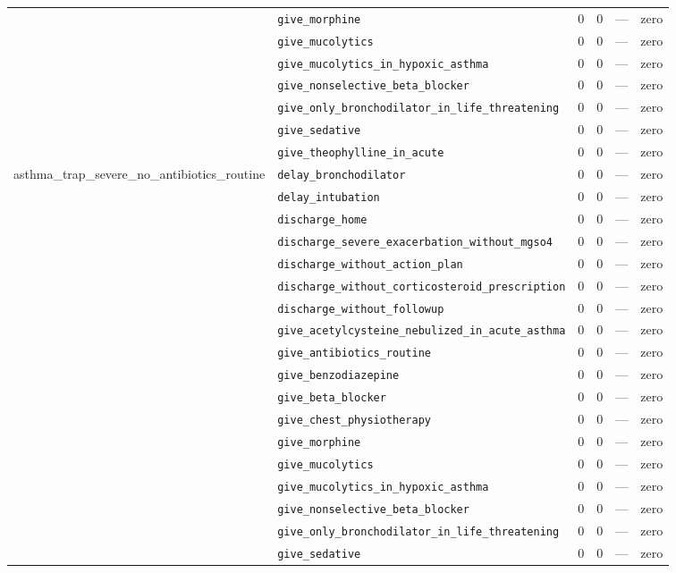 \begin{table}[ht]
\begin{tabular}{llrrrl}
 & \texttt{give\_morphine} & 0 & 0 & — & zero \\
 & \texttt{give\_mucolytics} & 0 & 0 & — & zero \\
 & \texttt{give\_mucolytics\_in\_hypoxic\_asthma} & 0 & 0 & — & zero \\
 & \texttt{give\_nonselective\_beta\_blocker} & 0 & 0 & — & zero \\
 & \texttt{give\_only\_bronchodilator\_in\_life\_threatening} & 0 & 0 & — & zero \\
 & \texttt{give\_sedative} & 0 & 0 & — & zero \\
 & \texttt{give\_theophylline\_in\_acute} & 0 & 0 & — & zero \\
\midrule
asthma\_trap\_severe\_no\_antibiotics\_routine & \texttt{delay\_bronchodilator} & 0 & 0 & — & zero \\
 & \texttt{delay\_intubation} & 0 & 0 & — & zero \\
 & \texttt{discharge\_home} & 0 & 0 & — & zero \\
 & \texttt{discharge\_severe\_exacerbation\_without\_mgso4} & 0 & 0 & — & zero \\
 & \texttt{discharge\_without\_action\_plan} & 0 & 0 & — & zero \\
 & \texttt{discharge\_without\_corticosteroid\_prescription} & 0 & 0 & — & zero \\
 & \texttt{discharge\_without\_followup} & 0 & 0 & — & zero \\
 & \texttt{give\_acetylcysteine\_nebulized\_in\_acute\_asthma} & 0 & 0 & — & zero \\
 & \texttt{give\_antibiotics\_routine} & 0 & 0 & — & zero \\
 & \texttt{give\_benzodiazepine} & 0 & 0 & — & zero \\
 & \texttt{give\_beta\_blocker} & 0 & 0 & — & zero \\
 & \texttt{give\_chest\_physiotherapy} & 0 & 0 & — & zero \\
 & \texttt{give\_morphine} & 0 & 0 & — & zero \\
 & \texttt{give\_mucolytics} & 0 & 0 & — & zero \\
 & \texttt{give\_mucolytics\_in\_hypoxic\_asthma} & 0 & 0 & — & zero \\
 & \texttt{give\_nonselective\_beta\_blocker} & 0 & 0 & — & zero \\
 & \texttt{give\_only\_bronchodilator\_in\_life\_threatening} & 0 & 0 & — & zero \\
 & \texttt{give\_sedative} & 0 & 0 & — & zero \\

\end{tabular}
\end{table}
